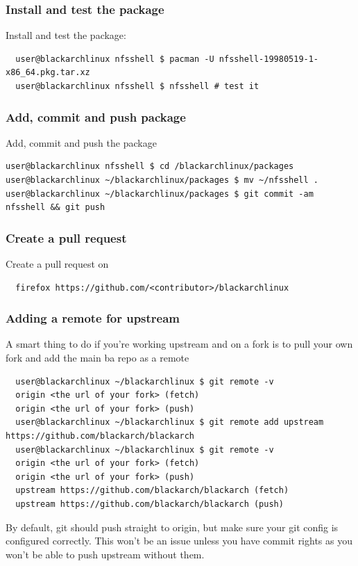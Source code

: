 \documentclass[a4paper, oneside, 11pt]{book}
\def\href#1#2{\htmladdnormallink{#2}{#1}}
\begin{document}
\subsubsection{Install and test the package}
Install and test the package:
\begin{lstlisting}
  user@blackarchlinux nfsshell $ pacman -U nfsshell-19980519-1-x86_64.pkg.tar.xz
  user@blackarchlinux nfsshell $ nfsshell # test it
\end{lstlisting}

\subsubsection{Add, commit and push package}
Add, commit and push the package
\begin{lstlisting}user@blackarchlinux nfsshell $ cd /blackarchlinux/packages
user@blackarchlinux ~/blackarchlinux/packages $ mv ~/nfsshell .
user@blackarchlinux ~/blackarchlinux/packages $ git commit -am nfsshell && git push
\end{lstlisting}

\subsubsection{Create a pull request}
Create a pull request on \href{https://github.com/}{github.com}
\begin{lstlisting}
  firefox https://github.com/<contributor>/blackarchlinux
\end{lstlisting}

\subsubsection{Adding a remote for upstream}
A smart thing to do if you're working upstream and on a fork is to pull your own fork and add the main ba repo as a remote
\begin{lstlisting}
  user@blackarchlinux ~/blackarchlinux $ git remote -v
  origin <the url of your fork> (fetch)
  origin <the url of your fork> (push)
  user@blackarchlinux ~/blackarchlinux $ git remote add upstream https://github.com/blackarch/blackarch
  user@blackarchlinux ~/blackarchlinux $ git remote -v
  origin <the url of your fork> (fetch)
  origin <the url of your fork> (push)
  upstream https://github.com/blackarch/blackarch (fetch)
  upstream https://github.com/blackarch/blackarch (push)
\end{lstlisting}

By default, git should push straight to origin, but make sure your git config is
configured correctly. This won't be an issue unless you have commit rights as
you won't be able to push upstream without them.
\end{document}
